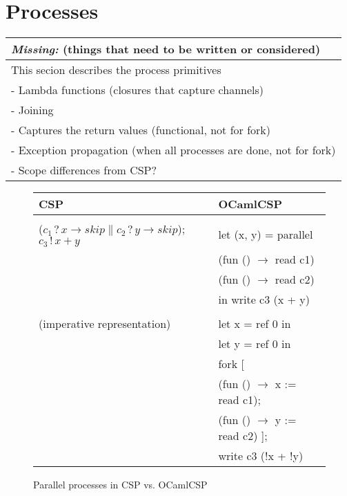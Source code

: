 \documentclass[11pt,oneside,a4paper]{article}
\newcommand{\missing}[1]{
\begin{tabular}{|p{11cm}|}
\hline
\emph{Missing:} {\scriptsize (things that need to be written or considered)} \\
\hline
#1
\hline
\end{tabular}
}
\begin{document}
\section{Processes}
\missing{
This secion describes the process primitives \\
- Lambda functions (closures that capture channels) \\
- Joining \\
- Captures the return values (functional, not for fork) \\
- Exception propagation (when all processes are done, not for fork) \\
- Scope differences from CSP? \\
}

\begin{figure}[h]
\centering
\begin{tabular}{l|l}
CSP & OCamlCSP \\
\hline
& \\
($c_1\,?\,x \to skip \parallel c_2\,?\,y \to skip$); $c_3\,!\,x + y$ & let (x, y) = parallel \\
& \quad (fun () $\to$ read c1) \\
& \quad (fun () $\to$ read c2) \\
& in write c3 (x + y) \\
& \\
(imperative representation) & let x = ref 0 in \\
& let y = ref 0 in \\
& fork [ \\
& \quad (fun () $\to$ x := read c1); \\
& \quad (fun () $\to$ y := read c2) ]; \\
& write c3 (!x + !y) \\
\end{tabular}
\caption{Parallel processes in CSP vs. OCamlCSP}
\label{channel-parallel}
\end{figure}
\end{document}
